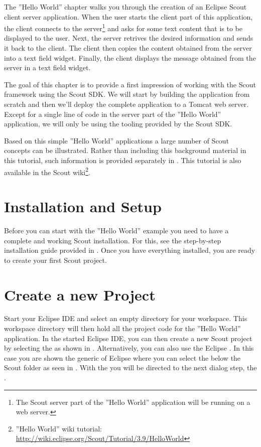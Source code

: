 \documentclass[a4paper,10pt,twoside]{book}
\begin{document}
The ''Hello World'' chapter walks you through the creation of an Eclipse Scout client server application.
When the user starts the client part of this application, the client connects to the server\footnote{
The Scout server part of the ''Hello World'' application will be running on a web server.
} 
and asks for some text content that is to be displayed to the user.
Next, the server retrives the desired information and sends it back to the client.
The client then copies the content obtained from the server into a text field widget.
Finally, the client displays the message obtained from the server in a text field widget.

The goal of this chapter is to provide a first impression of working with the Scout framework using the Scout SDK.
We will start by building the application from scratch and then we'll deploy the complete application to a Tomcat web server.
Except for a single line of code in the server part of the ''Hello World'' application, we will only be using the tooling provided by the Scout SDK.

Based on this simple ''Hello World'' applications a large number of Scout concepts can be illustrated.
Rather than including this background material in this tutorial, such information is provided separately in .
This tutorial is also available in the Scout wiki\footnote{
''Hello World'' wiki tutorial: \url{http://wiki.eclipse.org/Scout/Tutorial/3.9/HelloWorld}
}.

\section{Installation and Setup}

Before you can start with the ''Hello World'' example you need to have a complete and working Scout installation.
For this, see the step-by-step installation guide provided in .
Once you have everything installed, you are ready to create your first Scout project.

\section{Create a new Project}

Start your Eclipse IDE and select an empty directory for your workspace.
This workspace directory will then hold all the project code for the ''Hello World'' application.
In the started Eclipse IDE, you can then create a new Scout project by selecting the  as shown in .
Alternatively, you can also use the Eclipse .
In this case you are shown the generic  of Eclipse where you can select the  below the Scout folder as seen in .
With the  you will be directed to the next dialog step, the .
\end{document}
